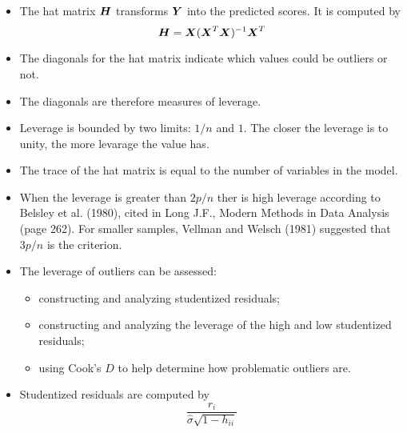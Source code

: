 \begin{frame}
  \begin{itemize}
    \item The hat matrix $ \boldsymbol{H} $ transforms $ \boldsymbol{Y} $ into the predicted scores. It is computed by
      $$ \boldsymbol{H} = \boldsymbol{X}(\boldsymbol{X}^T \boldsymbol{X})^{-1}\boldsymbol{X}^T $$
    \item The diagonals for the hat matrix indicate which values could be outliers or not.
    \item The diagonals are therefore measures of leverage.
    \item Leverage is bounded by two limits: $ 1/n $ and $ 1 $. The closer the leverage is to unity, the more levarage the value has.
    \item The trace of the hat matrix is equal to the number of variables in the model.
    \item When the leverage is greater than $ 2p/n $ ther is high leverage according to Belsley et al. (1980), cited in Long J.F., Modern Methods in Data Analysis (page 262). For smaller samples, Vellman and Welsch (1981) suggested that $3p/n$ is the criterion.
  \end{itemize}
\end{frame}

\begin{frame}
  \begin{itemize}
    \vspace{0.75cm}
    \item The leverage of outliers can be assessed:
      \begin{itemize}
        \vspace{0.25cm}
        \item constructing and analyzing studentized residuals;
        \vspace{0.25cm}
        \item constructing and analyzing the leverage of the high and low studentized residuals;
        \vspace{0.25cm}
        \item using Cook's $ D $ to help determine how problematic outliers are.
      \end{itemize}
    \vspace{0.5cm}
    \item Studentized residuals are computed by
      $$ \frac{r_i}{\hat{\sigma} \sqrt{1-h_{ii}}} $$
  \end{itemize}
\end{frame}



